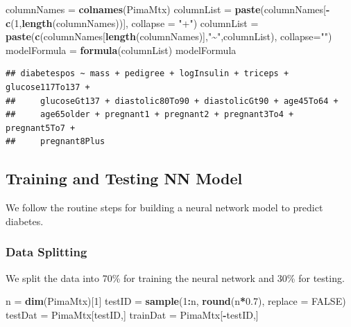\documentclass[
]{book}
\newenvironment{Shaded}{\begin{snugshade}}{\end{snugshade}}
\newcommand{\AttributeTok}[1]{\textcolor[rgb]{0.13,0.29,0.53}{#1}}
\newcommand{\ConstantTok}[1]{\textcolor[rgb]{0.56,0.35,0.01}{#1}}
\newcommand{\DecValTok}[1]{\textcolor[rgb]{0.00,0.00,0.81}{#1}}
\newcommand{\FloatTok}[1]{\textcolor[rgb]{0.00,0.00,0.81}{#1}}
\newcommand{\FunctionTok}[1]{\textcolor[rgb]{0.13,0.29,0.53}{\textbf{#1}}}
\newcommand{\NormalTok}[1]{#1}
\newcommand{\OtherTok}[1]{\textcolor[rgb]{0.56,0.35,0.01}{#1}}
\newcommand{\SpecialCharTok}[1]{\textcolor[rgb]{0.81,0.36,0.00}{\textbf{#1}}}
\newcommand{\StringTok}[1]{\textcolor[rgb]{0.31,0.60,0.02}{#1}}
\begin{document}
\begin{Shaded}
\begin{Highlighting}[]
\NormalTok{columnNames }\OtherTok{=} \FunctionTok{colnames}\NormalTok{(PimaMtx)}
\NormalTok{columnList }\OtherTok{=} \FunctionTok{paste}\NormalTok{(columnNames[}\SpecialCharTok{{-}}\FunctionTok{c}\NormalTok{(}\DecValTok{1}\NormalTok{,}\FunctionTok{length}\NormalTok{(columnNames))], }\AttributeTok{collapse =} \StringTok{"+"}\NormalTok{)}
\NormalTok{columnList }\OtherTok{=} \FunctionTok{paste}\NormalTok{(}\FunctionTok{c}\NormalTok{(columnNames[}\FunctionTok{length}\NormalTok{(columnNames)],}\StringTok{"\textasciitilde{}"}\NormalTok{,columnList), }\AttributeTok{collapse=}\StringTok{""}\NormalTok{)}
\NormalTok{modelFormula }\OtherTok{=} \FunctionTok{formula}\NormalTok{(columnList)}
\NormalTok{modelFormula}
\end{Highlighting}
\end{Shaded}

\begin{verbatim}
## diabetespos ~ mass + pedigree + logInsulin + triceps + glucose117To137 + 
##     glucoseGt137 + diastolic80To90 + diastolicGt90 + age45To64 + 
##     age65older + pregnant1 + pregnant2 + pregnant3To4 + pregnant5To7 + 
##     pregnant8Plus
\end{verbatim}

\hfill\break

\hypertarget{training-and-testing-nn-model}{%
\subsection{Training and Testing NN Model}\label{training-and-testing-nn-model}}

We follow the routine steps for building a neural network model to predict diabetes.

\hypertarget{data-splitting}{%
\subsubsection{Data Splitting}\label{data-splitting}}

We split the data into 70\% for training the neural network and 30\% for testing.

\begin{Shaded}
\begin{Highlighting}[]
\NormalTok{n }\OtherTok{=} \FunctionTok{dim}\NormalTok{(PimaMtx)[}\DecValTok{1}\NormalTok{]}
\NormalTok{testID }\OtherTok{=} \FunctionTok{sample}\NormalTok{(}\DecValTok{1}\SpecialCharTok{:}\NormalTok{n, }\FunctionTok{round}\NormalTok{(n}\SpecialCharTok{*}\FloatTok{0.7}\NormalTok{), }\AttributeTok{replace =} \ConstantTok{FALSE}\NormalTok{)}
\NormalTok{testDat }\OtherTok{=}\NormalTok{ PimaMtx[testID,]}
\NormalTok{trainDat }\OtherTok{=}\NormalTok{ PimaMtx[}\SpecialCharTok{{-}}\NormalTok{testID,]}
\end{Highlighting}
\end{Shaded}
\end{document}
